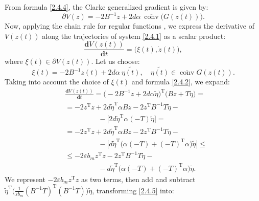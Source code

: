 \documentclass[journal]{IEEEtran}
\begin{document}
\begin{IEEEproof}
From formula \eqref{2.4.4}, the Clarke generalized gradient \cite{p14} is given by:
\[
\partial V(z) = -2B^{-1}z + 2d\alpha~\overline{\operatorname{conv}}\big(G(z(t))\big).
\]
Now, applying the chain rule for regular functions \cite{p9}, we express the derivative of $V(z(t))$ along the trajectories of system \eqref{2.4.1} as a scalar product:
\[
\frac{\mathbf{d}V(z(t))}{\mathbf{d}t} = \big( \xi(t), \dot z(t) \big), \tag{a.e.}
\]
where $\xi(t) \in \partial V(z(t))$. Let us choose:
\[
\xi(t) = -2B^{-1}z(t)+2d\alpha~\widetilde{\eta(t)}, \quad \widetilde{\eta(t)} \in \overline{\operatorname{conv}}G(z(t)).
\]
Taking into account the choice of $\xi (t)$ and formula \eqref{2.4.2}, we expand:
\begin{equation}\label{2.4.5}
\begin{aligned} & \frac{\mathbf{d}V(z(t))}{\mathbf{d}t} = \big(-2B^{-1}z+2d\alpha \widetilde{\eta}\big)^{\mathrm{T}}\big(Bz+T\widetilde{\eta}) =\\ 
& = -2z^{\mathrm{T}}z+2d\widetilde{\eta}^{\mathrm{T}}\alpha B z -  2z^{\mathrm{T}}B^{-1}T\widetilde{\eta} - \\
&~~~~~~~~~~~~~~~~~~~~~- \big[2d \widetilde{\eta}^{\mathrm{T}} \alpha (-T) \widetilde{\eta} \big]= \\
& = -2z^{\mathrm{T}}z+2d\widetilde{\eta}^{\mathrm{T}}\alpha B z - 2z^{\mathrm{T}}B^{-1}T\widetilde{\eta} - \\
& ~~~~~~~~~~~~~~~~~~~~~- \big[ d \widetilde{\eta}^{\mathrm{T}}\big(\alpha(-T)+(-T)^{\mathrm{T}}\alpha\big) \widetilde{\eta}\big] \leqslant\\
& \leqslant -2\varepsilon b_m z^{\mathrm{T}}z - 2z^{\mathrm{T}}B^{-1}T\widetilde{\eta} -\\&~~~~~~~~~~~~~~~~~~~~~- d \widetilde{\eta}^{\mathrm{T}}\big(\alpha(-T)+(-T)^{\mathrm{T}}\alpha\big) \widetilde{\eta}.
\end{aligned}
\end{equation}
We represent $-2\varepsilon b_m z^{\mathrm{T}}z$ as two terms, then add and subtract $\widetilde{\eta}^{\mathrm{T}}\big(\frac{1}{\varepsilon b_m}(B^{-1}T)^{\mathrm{T}}(B^{-1}T)\big)\widetilde{\eta}$, transforming \eqref{2.4.5} into:
\begin{equation*}\label{2.4.6}
\begin{aligned} 

\end{aligned}
\end{equation*}
\end{IEEEproof}
\end{document}
